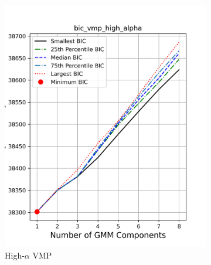 \documentclass[a4paper,12pt]{article}
\begin{document}
\begin{figure}[htbp]
    \centering

    \begin{subfigure}[t]{0.24\textwidth}
        \includegraphics[width=\textwidth]{../figures/bic_vmp_high_alpha.png}
        \caption{High-$\alpha$ VMP}
    \end{subfigure}
    \begin{subfigure}[t]{0.24\textwidth}

\end{subfigure}
\end{figure}
\end{document}
